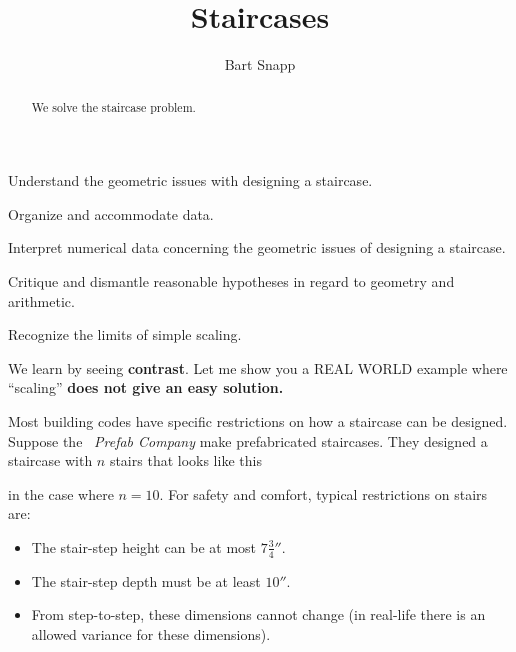 \documentclass[noauthor,nooutcomes,handout,12pt]{ximera}
\title{Staircases}
\author{Bart Snapp}
\begin{document}
\begin{abstract}
  We solve the staircase problem.
\end{abstract}
\maketitle

\begin{listOutcomes}  
\item{Understand the geometric issues with designing a staircase.}
\item{Organize and accommodate data.}
\item{Interpret numerical data concerning the geometric issues of designing a staircase.}
\item{Critique and dismantle reasonable hypotheses in regard to geometry and arithmetic.}
\item{Recognize the limits of simple scaling.}
\end{listOutcomes}

We learn by seeing \textbf{contrast}. Let me show you a REAL WORLD
example where ``scaling'' \textbf{does not give an easy solution.}


Most building codes have specific restrictions on how a staircase can
be designed. Suppose the \mooculus~\textit{Prefab Company} make
prefabricated staircases. They designed a staircase with $n$ stairs
that looks like this
\begin{center}
\end{center}
in the case where $n=10$. For safety and comfort, typical restrictions
on stairs are:
\begin{itemize}
\item The stair-step height can be at most $7\frac{3}{4}''$. 
\item The stair-step depth must be at least $10''$.
\item From step-to-step, these dimensions cannot change (in real-life there is
an allowed variance for these dimensions).
\end{itemize}
\end{document}
